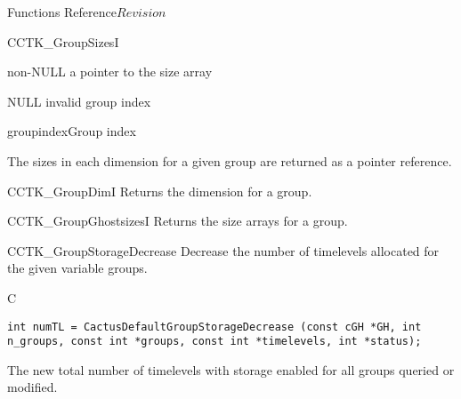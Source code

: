 \begin{cactuspart}{ Functions Reference}{}{$Revision$}
\begin{FunctionDescription}{CCTK\_GroupSizesI}
\begin{ResultSection}
\begin{Result}{non-NULL} a pointer to the size array\end{Result}
\begin{Result}{NULL} invalid group index \end{Result}
\end{ResultSection}

\begin{ParameterSection}
\begin{Parameter}{groupindex}Group index\end{Parameter}
\end{ParameterSection}

\begin{Discussion}
The sizes in each dimension for a given group are returned as a pointer reference.
\end{Discussion}

\begin{SeeAlsoSection}
\begin{SeeAlso}{CCTK\_GroupDimI}
Returns the dimension for a group.
\end{SeeAlso}
\begin{SeeAlso}{CCTK\_GroupGhostsizesI}
Returns the size arrays for a group.
\end{SeeAlso}
\end{SeeAlsoSection}
\end{FunctionDescription}


\begin{FunctionDescription}{CCTK\_GroupStorageDecrease}
\label{CCTK-GroupStorageDecrease}
Decrease the number of timelevels allocated for the given variable
groups.
\begin{SynopsisSection}
\begin{Synopsis}{C}
\begin{verbatim}int numTL = CactusDefaultGroupStorageDecrease (const cGH *GH, int n_groups, const int *groups, const int *timelevels, int *status);\end{verbatim}
\end{Synopsis}
\end{SynopsisSection}

\begin{ResultSection}
\begin{Result}{}
  The new total number of timelevels with storage enabled for all
  groups queried or modified.
\end{Result}
\end{ResultSection}


\end{FunctionDescription}
\end{cactuspart}
